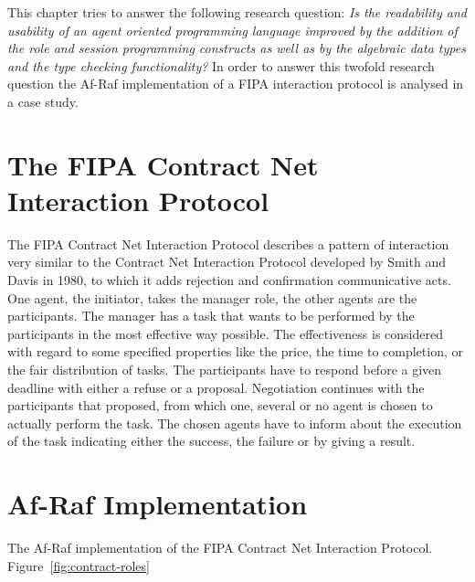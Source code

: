 \documentclass[a4paper,12pt,oneside,fleqn]{book} %
\begin{document}
This chapter tries to answer the following research question: \textit{Is
the readability and usability of an agent oriented programming language
improved by the addition of the role and session programming constructs as
well as by the algebraic data types and the type checking functionality?}
In order to answer this twofold research question the Af-Raf implementation
of a FIPA interaction protocol is analysed in a case study.

\section{The FIPA Contract Net Interaction Protocol} %
The FIPA Contract Net Interaction Protocol\cite{web:fipa} describes a
pattern of interaction very similar to the Contract Net Interaction
Protocol\cite{DBLP:journals/tc/Smith80a} developed by Smith and Davis in
1980, to which it adds rejection and confirmation communicative acts. One
agent, the initiator, takes the manager role, the other agents are the
participants. The manager has a task that wants to be performed by the
participants in the most effective way possible. The effectiveness is
considered with regard to some specified properties like the price, the
time to completion, or the fair distribution of tasks. The participants
have to respond before a given deadline with either a refuse or a proposal.
Negotiation continues with the participants that proposed, from which one,
several or no agent is chosen to actually perform the task. The chosen
agents have to inform about the execution of the task indicating either the
success, the failure or by giving a result.
\section{Af-Raf Implementation} %
The Af-Raf implementation of the FIPA Contract Net Interaction Protocol.
Figure~\ref{fig:contract-roles}
\end{document}
